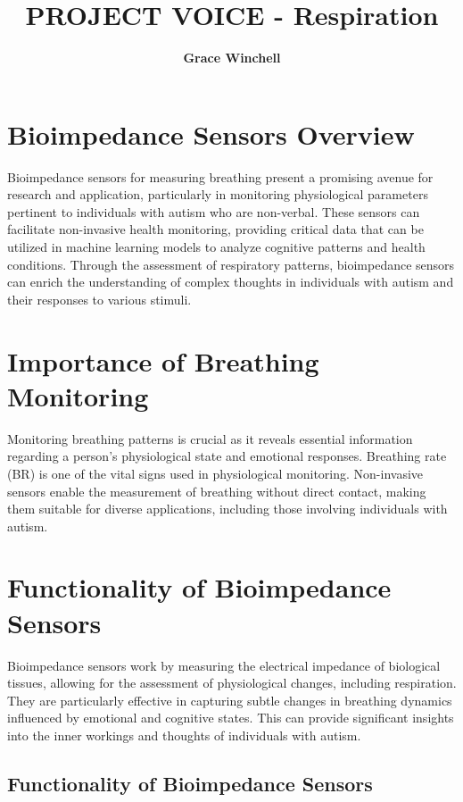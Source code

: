 \documentclass[twocolumn]{article}
\title{\textbf{PROJECT VOICE - Respiration}}
\author{\textbf{Grace Winchell}}
\begin{document}
\maketitle

\section{Bioimpedance Sensors Overview}

Bioimpedance sensors for measuring breathing present a promising avenue for research and application, particularly in monitoring physiological parameters pertinent to individuals with autism who are non-verbal. These sensors can facilitate non-invasive health monitoring, providing critical data that can be utilized in machine learning models to analyze cognitive patterns and health conditions. Through the assessment of respiratory patterns, bioimpedance sensors can enrich the understanding of complex thoughts in individuals with autism and their responses to various stimuli.


\section{Importance of Breathing Monitoring}

Monitoring breathing patterns is crucial as it reveals essential information regarding a person’s physiological state and emotional responses. Breathing rate (BR) is one of the vital signs used in physiological monitoring. Non-invasive sensors enable the measurement of breathing without direct contact, making them suitable for diverse applications, including those involving individuals with autism.\cite{Ahmed_Scully_Vaughan_Wilson_Ozanyan_2014} 

\section{Functionality of Bioimpedance Sensors}

Bioimpedance sensors work by measuring the electrical impedance of biological tissues, allowing for the assessment of physiological changes, including respiration. They are particularly effective in capturing subtle changes in breathing dynamics influenced by emotional and cognitive states.\cite{Truong_Kim_2024} This can provide significant insights into the inner workings and thoughts of individuals with autism. 

\subsection{Functionality of Bioimpedance Sensors}
\end{document}
